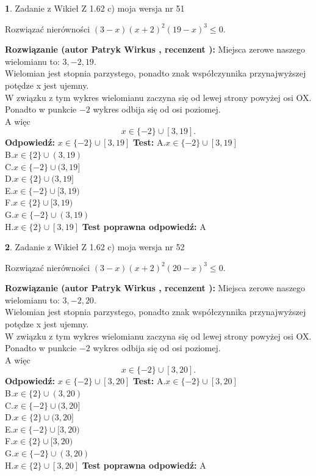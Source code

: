 \documentclass[12pt, a4paper]{article}
\theoremstyle{definition} %
\newtheorem{zad}{}
\newcommand{\zadStart}[1]{\begin{zad}#1\newline}
\newcommand{\zadStop}{\end{zad}}
\newcommand{\rozwStart}[2]{\noindent \textbf{Rozwiązanie (autor #1 , recenzent #2): }\newline}
\newcommand{\rozwStop}{\newline}
\newcommand{\odpStart}{\noindent \textbf{Odpowiedź:}\newline}
\newcommand{\odpStop}{\newline}
\newcommand{\testStart}{\noindent \textbf{Test:}\newline}
\newcommand{\testStop}{\newline}
\newcommand{\kluczStart}{\noindent \textbf{Test poprawna odpowiedź:}\newline}
\newcommand{\kluczStop}{\newline}
\begin{document}
\zadStart{Zadanie z Wikieł Z 1.62 c) moja wersja nr 51}

Rozwiązać nierówności $(3-x)(x+2)^{2}(19-x)^{3}\le0$.
\zadStop
\rozwStart{Patryk Wirkus}{}
Miejsca zerowe naszego wielomianu to: $3, -2, 19$.\\
Wielomian jest stopnia parzystego, ponadto znak współczynnika przy\linebreak najwyższej potędze x jest ujemny.\\ W związku z tym wykres wielomianu zaczyna się od lewej strony powyżej osi OX.\\
Ponadto w punkcie $-2$ wykres odbija się od osi poziomej.\\
A więc $$x \in \{-2\} \cup [3,19].$$
\rozwStop
\odpStart
$x \in \{-2\} \cup [3,19]$
\odpStop
\testStart
A.$x \in \{-2\} \cup [3,19]$\\
B.$x \in \{2\} \cup (3,19)$\\
C.$x \in \{-2\} \cup (3,19]$\\
D.$x \in \{2\} \cup (3,19]$\\
E.$x \in \{-2\} \cup [3,19)$\\
F.$x \in \{2\} \cup [3,19)$\\
G.$x \in \{-2\} \cup (3,19)$\\
H.$x \in \{2\} \cup [3,19]$
\testStop
\kluczStart
A
\kluczStop



\zadStart{Zadanie z Wikieł Z 1.62 c) moja wersja nr 52}

Rozwiązać nierówności $(3-x)(x+2)^{2}(20-x)^{3}\le0$.
\zadStop
\rozwStart{Patryk Wirkus}{}
Miejsca zerowe naszego wielomianu to: $3, -2, 20$.\\
Wielomian jest stopnia parzystego, ponadto znak współczynnika przy\linebreak najwyższej potędze x jest ujemny.\\ W związku z tym wykres wielomianu zaczyna się od lewej strony powyżej osi OX.\\
Ponadto w punkcie $-2$ wykres odbija się od osi poziomej.\\
A więc $$x \in \{-2\} \cup [3,20].$$
\rozwStop
\odpStart
$x \in \{-2\} \cup [3,20]$
\odpStop
\testStart
A.$x \in \{-2\} \cup [3,20]$\\
B.$x \in \{2\} \cup (3,20)$\\
C.$x \in \{-2\} \cup (3,20]$\\
D.$x \in \{2\} \cup (3,20]$\\
E.$x \in \{-2\} \cup [3,20)$\\
F.$x \in \{2\} \cup [3,20)$\\
G.$x \in \{-2\} \cup (3,20)$\\
H.$x \in \{2\} \cup [3,20]$
\testStop
\kluczStart
A
\kluczStop
\end{document}
